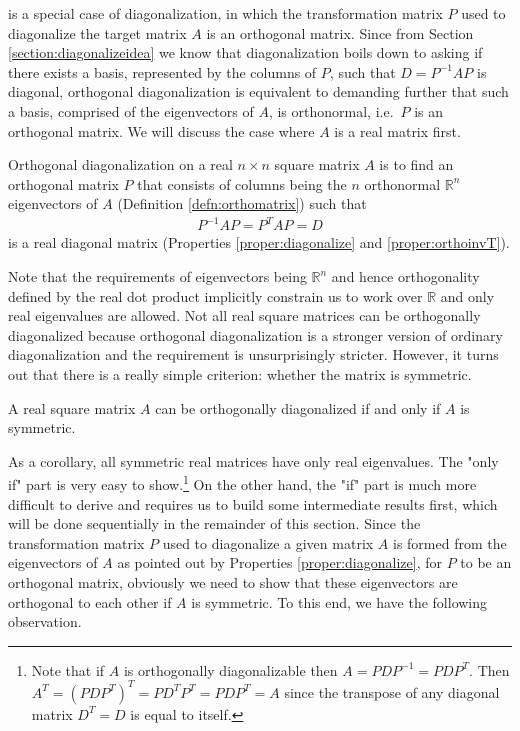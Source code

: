  is a special case of diagonalization, in which the transformation matrix $P$ used to diagonalize the target matrix $A$ is an orthogonal matrix. Since from Section \ref{section:diagonalizeidea} we know that diagonalization boils down to asking if there exists a basis, represented by the columns of $P$, such that $D = P^{-1}AP$ is diagonal, orthogonal diagonalization is equivalent to demanding further that such a basis, comprised of the eigenvectors of $A$, is orthonormal, i.e.\ $P$ is an orthogonal matrix. We will discuss the case where $A$ is a real matrix first.
\begin{defn}
\label{defn:orthodiagonal}
Orthogonal diagonalization on a real $n \times n$ square matrix $A$ is to find an orthogonal matrix $P$ that consists of columns being the $n$ orthonormal $\mathbb{R}^n$ eigenvectors of $A$ (Definition \ref{defn:orthomatrix}) such that
\begin{align}
P^{-1}AP = P^TAP = D \label{eqn:orthodiagonalPAP} 
\end{align}
is a real diagonal matrix (Properties \ref{proper:diagonalize} and \ref{proper:orthoinvT}).
\end{defn}
Note that the requirements of eigenvectors being $\mathbb{R}^n$ and hence orthogonality defined by the real dot product implicitly constrain us to work over $\mathbb{R}$ and only real eigenvalues are allowed. Not all real square matrices can be orthogonally diagonalized because orthogonal diagonalization is a stronger version of ordinary diagonalization and the requirement is unsurprisingly stricter. However, it turns out that there is a really simple criterion: whether the matrix is symmetric.
\begin{thm}
\label{thm:symdiag}
A real square matrix $A$ can be orthogonally diagonalized if and only if $A$ is symmetric.
\end{thm}
As a corollary, all symmetric real matrices have only real eigenvalues. The "only if" part is very easy to show.\footnote{Note that if $A$ is orthogonally diagonalizable then $A = PDP^{-1} = PDP^T$. Then $A^T = (PDP^T)^T = PD^TP^T = PDP^T = A$ since the transpose of any diagonal matrix $D^T = D$ is equal to itself.} On the other hand, the "if" part is much more difficult to derive and requires us to build some intermediate results first, which will be done sequentially in the remainder of this section. Since the transformation matrix $P$ used to diagonalize a given matrix $A$ is formed from the eigenvectors of $A$ as pointed out by Properties \ref{proper:diagonalize}, for $P$ to be an orthogonal matrix, obviously we need to show that these eigenvectors are orthogonal to each other if $A$ is symmetric. To this end, we have the following observation.
